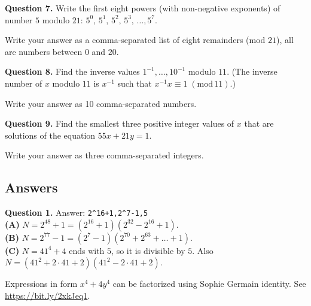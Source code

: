 \documentclass[jou]{apa6}
\begin{document}
\vspace{10pt}
{\bf Question 7.} Write the first eight powers (with non-negative exponents) 
of number $5$ modulo $21$: $5^0,\,5^1,\,5^2,\,5^3,\,\ldots,5^{7}$.

Write your answer as a comma-separated list of eight remainders (mod $21$), \textendash{} all are numbers between $0$ and $20$.


\vspace{10pt}
{\bf Question 8.} Find the inverse values $1^{-1},\ldots,10^{-1}$ modulo $11$. (The inverse number of $x$ modulo $11$ 
is $x^{-1}$ such that $x^{-1}x \equiv 1\;(\text{mod}\,11)$.)

Write your answer as 10 comma-separated numbers.


\vspace{10pt}
{\bf Question 9.} Find the smallest three positive integer values of $x$ that
are solutions of the equation $55x + 21y=1$. 

Write your answer as three comma-separated integers. 


\newpage 
\subsection{Answers}

\vspace{6pt}
{\bf Question 1.} Answer: {\tt 2\^{}16+1,2\^{}7-1,5}\\

{\bf (A)} $N = 2^{48} + 1 = \left( 2^{16} + 1 \right) \left( 2^{32} - 2^{16} + 1 \right)$.\\
{\bf (B)} $N = 2^{77} - 1 = \left( 2^{7} - 1 \right) \left( 2^{70} + 2^{63} + \ldots + 1 \right)$.\\
{\bf (C)} $N = 41^4 + 4$ ends with $5$, so it is divisible by $5$. 
Also $N = \left( 41^2 + 2 \cdot 41 + 2 \right) \left( 41^2 - 2 \cdot 41 + 2 \right)$. 

Expressions in form $x^4 + 4y^4$ can be factorized using Sophie Germain identity. 
See \url{https://bit.ly/2xkJeq1}.
\end{document}
